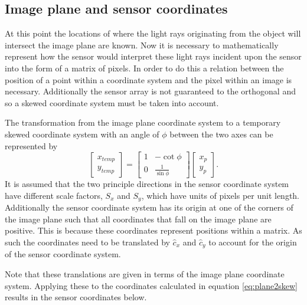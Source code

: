 \documentclass[12pt,oneside,openany,a4paper, %
english, %
masters-t, goldenblock]{usthesis}
\begin{document}

\subsection{Image plane and sensor coordinates}
At this point the locations of where the light rays originating from the object will intersect the image plane are known. Now it is necessary to mathematically represent how the sensor would interpret these light rays incident upon the sensor into the form of a matrix of pixels. In order to do this a relation between the position of a point within a coordinate system and the pixel within an image is necessary. Additionally the sensor array is not guaranteed to the orthogonal and so a skewed coordinate system must be taken into account.

The transformation from the image plane coordinate system to a temporary skewed coordinate system with an angle of $\phi$ between the two axes can be represented by
\begin{equation}
\label{eq:plane2skew}
  \begin{bmatrix}
  x_{temp} \\
  y_{temp} 
  \end{bmatrix} =
  \begin{bmatrix}
  1 & -\cot \phi \\
  0 & \frac{1}{\sin \phi}
  \end{bmatrix}
  \begin{bmatrix}
  x_p\\
  y_p
  \end{bmatrix}.
\end{equation}
It is assumed that the two principle directions in the sensor coordinate system have different scale factors, $S_x$ and $S_y$, which have units of pixels per unit length. Additionally the sensor coordinate system has its origin at one of the corners of the image plane such that all coordinates that fall on the image plane are positive. This is because these coordinates represent positions within a matrix. As such the coordinates need to be translated by $\hat c_x$ and $\hat c_y$ to account for the origin of the sensor coordinate system. 

Note that these translations are given in terms of the image plane coordinate system. Applying these to the coordinates calculated in equation \ref{eq:plane2skew} results in the sensor coordinates below.
\end{document}
